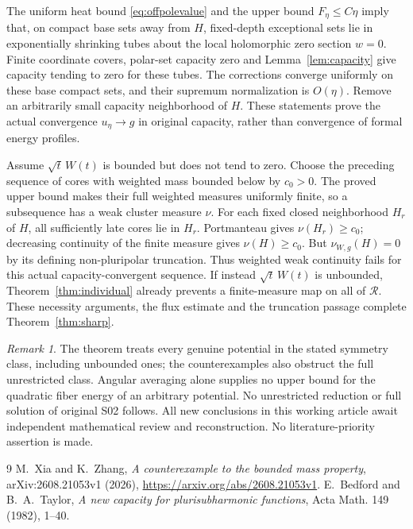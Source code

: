 \documentclass[11pt]{article}
\theoremstyle{remark}
\newtheorem{remark}[theorem]{Remark}
\begin{document}
The uniform heat bound \eqref{eq:offpolevalue} and the upper bound
$F_\eta\leq C\eta$ imply that, on compact base sets away from $H$,
fixed-depth exceptional sets lie in exponentially shrinking tubes about
the local holomorphic zero section $w=0$. Finite coordinate covers,
polar-set capacity zero and Lemma~\ref{lem:capacity} give capacity
tending to zero for these tubes. The corrections converge uniformly on
these base compact sets, and their supremum normalization is $O(\eta)$.
Remove an arbitrarily small capacity neighborhood of $H$. These
statements prove the actual convergence $u_\eta\to g$ in original
capacity, rather than convergence of formal energy profiles.

Assume $\sqrt t\,W(t)$ is bounded but does not tend to zero. Choose
the preceding sequence of cores with weighted mass bounded below by
$c_0>0$. The proved upper bound makes their full weighted measures
uniformly finite, so a subsequence has a weak cluster measure $\nu$.
For each fixed closed neighborhood $H_r$ of $H$, all sufficiently late
cores lie in $H_r$. Portmanteau gives $\nu(H_r)\geq c_0$; decreasing
continuity of the finite measure gives $\nu(H)\geq c_0$.
But $\nu_{W,g}(H)=0$ by its defining non-pluripolar truncation.
Thus weighted weak continuity fails for this actual capacity-convergent
sequence. If instead $\sqrt t\,W(t)$ is unbounded,
Theorem~\ref{thm:individual} already prevents a finite-measure map on
all of $\mathcal R$. These necessity arguments, the flux estimate and
the truncation passage complete Theorem~\ref{thm:sharp}.

\begin{remark}
The theorem treats every genuine potential in the stated symmetry class,
including unbounded ones; the counterexamples also obstruct the full
unrestricted class. Angular averaging alone supplies no upper bound for
the quadratic fiber energy of an arbitrary potential. No unrestricted
reduction or full solution of original S02 follows. All new conclusions
in this working article await independent mathematical review and
reconstruction. No literature-priority assertion is made.
\end{remark}

\begin{thebibliography}{9}
M.~Xia and K.~Zhang,
\emph{A counterexample to the bounded mass property},
arXiv:2608.21053v1 (2026),
\url{https://arxiv.org/abs/2608.21053v1}.
E.~Bedford and B.~A.~Taylor,
\emph{A new capacity for plurisubharmonic functions},
Acta Math. 149 (1982), 1--40.
\end{thebibliography}
\end{document}
